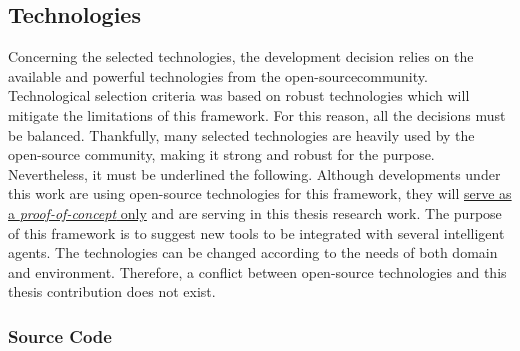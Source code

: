 \subsection{Technologies}
\label{sec:sec004004001}

Concerning the selected technologies, the development decision relies on the available and powerful technologies from the open-source\footnotemark[14] community.
Technological selection criteria was based on robust technologies which will mitigate the limitations of this framework.
For this reason, all the decisions must be balanced.
Thankfully, many selected technologies are heavily used by the open-source community, making it strong and robust for the purpose.
Nevertheless, it must be underlined the following.
Although developments under this work are using open-source technologies for this framework, they will \underline{serve as a {\it proof-of-concept} only} and are serving in this thesis research work.
The purpose of this framework is to suggest new tools to be integrated with several intelligent agents.
The technologies can be changed according to the needs of both domain and environment.
Therefore, a conflict between open-source technologies and this thesis contribution does not exist.


\subsubsection{Source Code}
\label{sec:sec004004001001}

